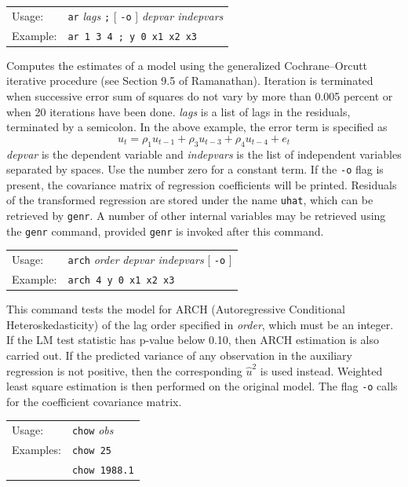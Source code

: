 \documentclass{article}
\begin{document}
{

\begin{tabular}{ll}
Usage: & \texttt{ar} \textit{lags} \texttt{;} [ \texttt{-o} ]
         \textit{depvar indepvars} \\ 
Example:   &     \texttt{ar 1 3 4 ; y 0 x1 x2 x3} 
\end{tabular}

Computes the estimates of a model using the generalized
Cochrane--Orcutt iterative procedure (see Section 9.5 of Ramanathan).
Iteration is terminated when successive error sum of squares do not
vary by more than 0.005 percent or when 20 iterations have been done.
\textit{lags} is a list of lags in the residuals, terminated by a
semicolon.  In the above example, the error term is specified as
$$u_t = \rho_1u_{t-1} + \rho_3 u_{t-3} + \rho_4 u_{t-4} + e_t$$
\textit{depvar} is the dependent variable and \textit{indepvars} is
the list of independent variables separated by spaces.  Use the number
zero for a constant term.  If the \texttt{-o} flag is present, the
covariance matrix of regression coefficients will be printed.
Residuals of the transformed regression are stored under the name
\texttt{uhat}, which can be retrieved by \texttt{genr}.  A number of
other internal variables may be retrieved using the \texttt{genr}
command, provided \texttt{genr} is invoked after this
command.


\begin{tabular}{ll}
Usage: & \texttt{arch} \textit{order} \textit{depvar indepvars} [ \texttt{-o} ]\\
Example:   &     \texttt{arch 4 y 0 x1 x2 x3} 
\end{tabular}

This command tests the model for ARCH (Autoregressive Conditional
Heteroskedasticity) of the lag order specified in \textit{order},
which must be an integer.  If the LM test statistic has p-value below
0.10, then ARCH estimation is also carried out.  If the predicted
variance of any observation in the auxiliary regression is not
positive, then the corresponding $\hat{u}^2$ is used instead.
Weighted least square estimation is then performed on the original
model.  The flag \texttt{-o} calls for the coefficient covariance
matrix.  


\begin{tabular}{ll}
Usage:  &      \texttt{chow} \textit{obs}\\
Examples:  &   \texttt{chow 25}\\
           &   \texttt{chow 1988.1}
\end{tabular}

}
\end{document}
